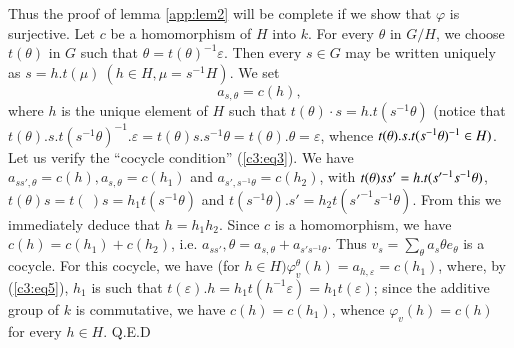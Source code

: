         Thus the proof of lemma \ref{app:lem2} will be complete if we
        show that 
        $\varphi$ is surjective. Let $c$ be a homomorphism of $H$ into
        $k$. For every $\theta$ in $G/H$, we choose $t(\theta)$ in $G$
        such that $\theta = t(\theta)^{-1} \varepsilon$. Then every
        $s \in G$ may be written uniquely as $s = h.t (\mu) ~ (h \in
        H, \mu = s^{-1} H)$. We set  
        \begin{equation*}
a_{s, \theta} = c(h),\tag{5}\label{c3:eq5} 
        \end{equation*}
        where $h$ is the unique element of $H$ such that $t(\theta)
        \cdot  s = h.t (s^{-1} \theta)$ (notice that $t (\theta). s.t (s^{-1}
        \theta)^{-1}. \varepsilon = t(\theta) s.s ^{-1} \theta = t
        (\theta). \theta = \varepsilon$, whence $t (\theta) . s. t\break
        (s^{-1} \theta )^{-1} \in H)$. Let us verify the ``cocycle
        condition'' (\ref{c3:eq3}). We have $a_{ss', \theta} = c(h), a_{s,
          \theta} = c(h_1)$ and $a_{s' , s^{-1} \theta} = c(h_2)$,
        with $t(\theta) ss' = h.t\break (s'^{-1} s^{-1} \theta)$, $t
        (\theta)s = t (~ ) s = h_1 t (s^{-1} \theta)$ and $t (s^{-1}
        \theta). s' = h_2 t(s'^{-1} s^{-1} \theta)$.  From this we
        immediately deduce that  $h = h_1 h_2$. Since $c$ is a
        homomorphism, we have $c(h) = c(h_1) + c(h_2)$, i.e. $a_{ss'},
        \theta = a_{s, \theta}+ a_{s' s ^{-1} \theta}$. Thus $v_s  =
        \sum\limits_{\theta} a_s \theta e_\theta$  is a  cocycle. For
        this cocycle, we have (for $h \in H) \varphi^\theta_v (h) =
        a_{h, \varepsilon} = c(h_1)$, where, by (\ref{c3:eq5}), $h_1$ is such
        that $t(\varepsilon). h = h_1 t (h^{-1} \varepsilon) = h_1
        t(\varepsilon)$; since the additive group of $k$ is
        commutative, we have $c(h) = c(h_1)$, whence $\varphi_v (h) =
        c(h) $ for every $h \in H$. 
        \hfill{Q.E.D}

